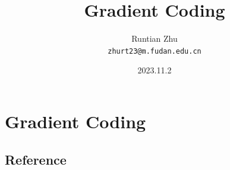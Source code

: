 \documentclass{beamer}
\title{Gradient Coding}
\author{Runtian Zhu \\ \texttt{zhurt23@m.fudan.edu.cn}}
\date{2023.11.2}
\begin{document}
\captionsetup[figure]{labelformat=empty}

\begin{frame}
  \titlepage
\end{frame}


\section{Gradient Coding}

\subsection{Reference}
\end{document}
